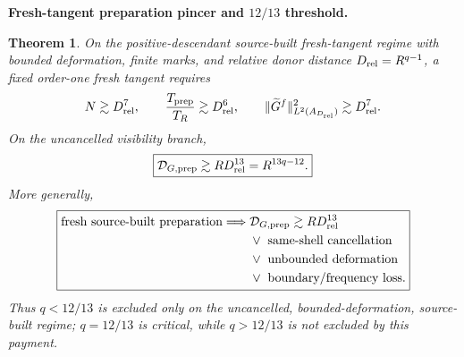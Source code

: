 \documentclass[11pt]{article}
\newtheorem{theorem}{Theorem}[section]
\theoremstyle{definition}\newtheorem{definition}[theorem]{Definition}
\theoremstyle{remark}\newtheorem{remark}[theorem]{Remark}
\begin{document}
\medskip
\noindent\textbf{Fresh-tangent preparation pincer and $12/13$ threshold.}
\begin{theorem}\label{thm:q1213}
On the positive-descendant source-built fresh-tangent regime with bounded
deformation, finite marks, and relative donor distance
$D_{\rm rel}=R^{q-1}$, a fixed order-one fresh tangent requires
\[
N\gtrsim D_{\rm rel}^7,
\qquad
\frac{T_{\rm prep}}{T_R}\gtrsim D_{\rm rel}^6,
\qquad
\|\widetilde G^f\|_{L^2(A_{D_{\rm rel}})}^2\gtrsim D_{\rm rel}^7.
\]
On the uncancelled visibility branch,
\[
\boxed{
\mathcal D_{G,\rm prep}
\gtrsim R D_{\rm rel}^{13}
=R^{13q-12}.}
\]
More generally,
\[
\boxed{\begin{aligned}
\text{fresh source-built preparation}\Longrightarrow{}&
\mathcal D_{G,\rm prep}\gtrsim R D_{\rm rel}^{13}\\
&\vee\ \text{same-shell cancellation}\\
&\vee\ \text{unbounded deformation}\\
&\vee\ \text{boundary/frequency loss}.
\end{aligned}}
\]
Thus $q<12/13$ is excluded only on the uncancelled, bounded-deformation,
source-built regime; $q=12/13$ is critical, while $q>12/13$ is not excluded by
this payment.
\end{theorem}
\end{document}
